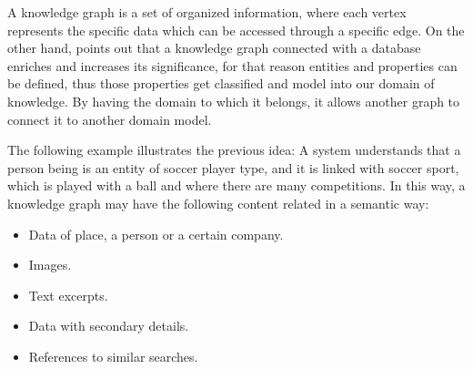 A knowledge graph is a set of organized information, where each vertex 
represents the specific data which can be accessed through a specific edge. 
On the other hand, \cite{Saorin} points out that a knowledge graph connected 
with a database enriches and increases its
significance, for that reason entities and properties can be defined, thus those 
properties get classified and model  into our domain of knowledge. By having 
the domain to which it belongs, it allows another graph to connect it to another 
domain model.

The following example illustrates the previous idea: A system understands that 
a person being is an entity of soccer player type, and it is linked with soccer 
sport, which is played with a ball and where there are many competitions. 
In this way, a knowledge graph may have the following content related in a 
semantic way:

\begin{itemize}
\item Data of place, a person or a certain company.
\item Images.
\item Text excerpts.
\item Data with secondary details.
\item References to similar searches.
\end{itemize}

